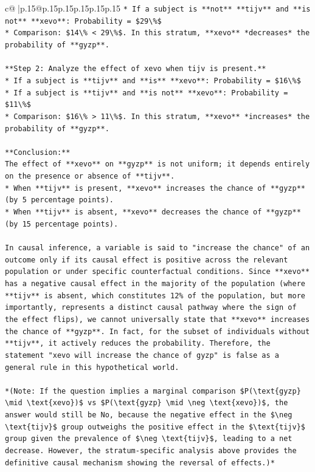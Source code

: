 \documentclass{article}
\begin{document}
{\begin{supertabular}{c@{$\;$}|p{.15\linewidth}@{}p{.15\linewidth}p{.15\linewidth}p{.15\linewidth}p{.15\linewidth}p{.15\linewidth}}
{{{\texttt{*   If a subject is **not** **tijv** and **is not** **xevo**: Probability = \$29\textbackslash{}\%\$} \\
\texttt{*   Comparison: \$14\textbackslash{}\% < 29\textbackslash{}\%\$. In this stratum, **xevo** *decreases* the probability of **gyzp**.} \\
\\ 
\texttt{**Step 2: Analyze the effect of xevo when tijv is present.**} \\
\texttt{*   If a subject is **tijv** and **is** **xevo**: Probability = \$16\textbackslash{}\%\$} \\
\texttt{*   If a subject is **tijv** and **is not** **xevo**: Probability = \$11\textbackslash{}\%\$} \\
\texttt{*   Comparison: \$16\textbackslash{}\% > 11\textbackslash{}\%\$. In this stratum, **xevo** *increases* the probability of **gyzp**.} \\
\\ 
\texttt{**Conclusion:**} \\
\texttt{The effect of **xevo** on **gyzp** is not uniform; it depends entirely on the presence or absence of **tijv**.} \\
\texttt{*   When **tijv** is present, **xevo** increases the chance of **gyzp** (by 5 percentage points).} \\
\texttt{*   When **tijv** is absent, **xevo** decreases the chance of **gyzp** (by 15 percentage points).} \\
\\ 
\texttt{In causal inference, a variable is said to "increase the chance" of an outcome only if its causal effect is positive across the relevant population or under specific counterfactual conditions. Since **xevo** has a negative causal effect in the majority of the population (where **tijv** is absent, which constitutes 12\% of the population, but more importantly, represents a distinct causal pathway where the sign of the effect flips), we cannot universally state that **xevo** increases the chance of **gyzp**. In fact, for the subset of individuals without **tijv**, it actively reduces the probability. Therefore, the statement "xevo will increase the chance of gyzp" is false as a general rule in this hypothetical world.} \\
\\ 
\texttt{*(Note: If the question implies a marginal comparison \$P(\textbackslash{}text\{gyzp\} \textbackslash{}mid \textbackslash{}text\{xevo\})\$ vs \$P(\textbackslash{}text\{gyzp\} \textbackslash{}mid \textbackslash{}neg \textbackslash{}text\{xevo\})\$, the answer would still be No, because the negative effect in the \$\textbackslash{}neg \textbackslash{}text\{tijv\}\$ group outweighs the positive effect in the \$\textbackslash{}text\{tijv\}\$ group given the prevalence of \$\textbackslash{}neg \textbackslash{}text\{tijv\}\$, leading to a net decrease. However, the stratum{-}specific analysis above provides the definitive causal mechanism showing the reversal of effects.)*} \\
}}}
\end{supertabular}}
\end{document}
